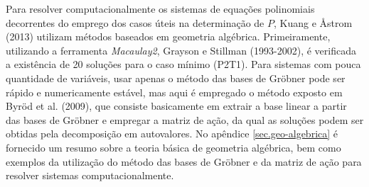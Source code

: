 Para resolver computacionalmente os sistemas de equações polinomiais decorrentes do emprego dos casos úteis na determinação de $P$, Kuang e \AA str\:om (2013) utilizam m\'etodos baseados em geometria algébrica. Primeiramente, utilizando a ferramenta {\it Macaulay2}, Grayson e Stillman (1993-2002), é verificada a existência de 20 soluções para o caso mínimo (P2T1). Para sistemas com pouca quantidade de variáveis, usar apenas o método das bases de Gr\"obner pode ser rápido e numericamente estável, mas aqui é empregado o método exposto em Byr\"od et al. (2009), que consiste basicamente em extrair a base linear a partir das bases de Gr\"obner e empregar a matriz de ação, da qual as soluções podem ser obtidas pela decomposição em autovalores. No apêndice \ref{sec.geo-algebrica} é fornecido um resumo sobre a teoria básica de geometria algébrica, bem como exemplos da utilização do método das bases de Gr\"obner e da matriz de ação para resolver sistemas computacionalmente.
